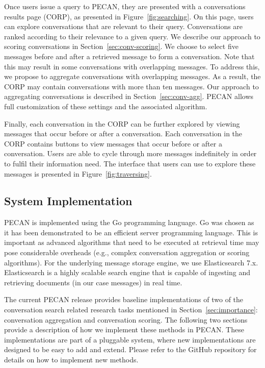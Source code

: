 Once users issue a query to PECAN, they are presented with a conversations results page (CORP), as presented in Figure~\ref{fig:searching}. On this page, users can explore conversations that are relevant to their query. Conversations are ranked according to their relevance to a given query. We describe our approach to scoring conversations in Section~\ref{sec:conv-scoring}. We choose to select five messages before and after a retrieved message to form a conversation. Note that this may result in some conversations with overlapping messages. To address this, we propose to aggregate conversations with overlapping messages. As a result, the CORP may contain conversations with more than ten messages. Our approach to aggregating conversations is described in Section~\ref{sec:conv-agg}. PECAN allows full customization of these settings and the associated algorithm. 

Finally, each conversation in the CORP can be further explored by viewing messages that occur before or after a conversation. Each conversation in the CORP contains buttons to view messages that occur before or after a conversation. Users are able to cycle through more messages indefinitely in order to fulfil their information need. The interface that users can use to explore these messages is presented in Figure~\ref{fig:traversing}.


\subsection{System Implementation}

PECAN is implemented using the Go programming language. Go was chosen as it has been demonstrated to be an efficient server programming language. This is important as advanced algorithms that need to be executed at retrieval time may pose considerable overheads (e.g., complex conversation aggregation or scoring algorithms). For the underlying message storage engine, we use Elasticsearch 7.x. Elasticsearch is a highly scalable search engine that is capable of ingesting and retrieving documents (in our case messages) in real time.

The current PECAN release provides baseline implementations of two of the conversation search related research tasks mentioned in Section~\ref{sec:importance}: conversation aggregation and conversation scoring. The following two sections provide a description of how we implement these methods in PECAN. These implementations are part of a pluggable system, where new implementations are designed to be easy to add and extend. Please refer to the GitHub repository for details on how to implement new methods.

